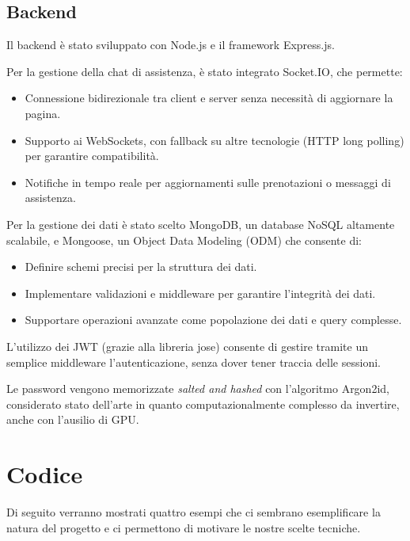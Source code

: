 \documentclass{report}
\begin{document}
\subsection{Backend}
\par Il backend è stato sviluppato con Node.js e il framework Express.js.
\par Per la gestione della chat di assistenza, è stato integrato Socket.IO, che permette:
\begin{itemize}
    \item Connessione bidirezionale tra client e server senza necessità di aggiornare la pagina.
    \item Supporto ai WebSockets, con fallback su altre tecnologie (HTTP long polling) per garantire compatibilità.
    \item Notifiche in tempo reale per aggiornamenti sulle prenotazioni o messaggi di assistenza.
\end{itemize}
\par Per la gestione dei dati è stato scelto MongoDB, un database NoSQL altamente scalabile, e Mongoose, un Object Data Modeling (ODM) che consente di:
\begin{itemize}
    \item Definire schemi precisi per la struttura dei dati.
    \item Implementare validazioni e middleware per garantire l'integrità dei dati.
    \item Supportare operazioni avanzate come popolazione dei dati e query complesse.
\end{itemize}
\par L'utilizzo dei JWT (grazie alla libreria jose)  consente di gestire tramite un semplice middleware l'autenticazione, senza dover tener traccia delle sessioni.
\par Le password vengono memorizzate \textit{salted and hashed} con l'algoritmo Argon2id, considerato stato dell'arte in quanto computazionalmente complesso da invertire, anche con l'ausilio di GPU.
\section{Codice}
\par Di seguito verranno mostrati quattro esempi che ci sembrano esemplificare la natura del progetto e ci permettono di motivare le nostre scelte tecniche.
\end{document}
